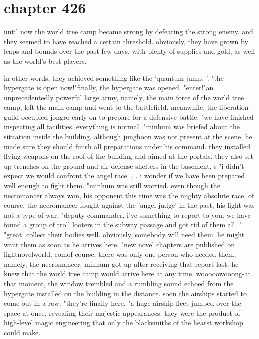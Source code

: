 \section{chapter 426}

until now the world tree camp became strong by defeating the strong enemy.
 and they seemed to have reached a certain threshold.
 obviously, they have grown by leaps and bounds over the past few days, with plenty of supplies and gold, as well as the world's best players.





in other words, they achieved something like the 'quantum jump.
'.
"the hypergate is open now!"finally, the hypergate was opened.
"enter!"an unprecedentedly powerful large army, namely, the main force of the world tree camp, left the main camp and went to the battlefield.
meanwhile, the liberation guild occupied jongro early on to prepare for a defensive battle.
"we have finished inspecting all facilities.
 everything is normal.
"minhum was briefed about the situation inside the building.
 although junghoon was not present at the scene, he made sure they should finish all preparations under his command.
they installed flying weapons on the roof of the building and aimed at the portals.
 they also set up trenches on the ground and air defense shelters in the basement.
s "i didn't expect we would confront the angel race.
.
.
i wonder if we have been prepared well enough to fight them.
"minhum was still worried.
 even though the necromancer always won, his opponent this time was the mighty absolute race.
of course, the necromancer fought against the 'angel judge' in the past, his fight was not a type of war.
"deputy commander, i've something to report to you.
 we have found a group of troll looters in the subway passage and got rid of them all.
"
"great.
 collect their bodies well.
 obviously, somebody will need them.
 he might want them as soon as he arrives here.
"new novel chapters are published on lightnovelworld.
comof course, there was only one person who needed them, namely, the necromancer.
minhum got up after receiving that report last.
 he knew that the world tree camp would arrive here at any time.
wooooowooong-at that moment, the window trembled and a rumbling sound echoed from the hypergate installed on the building in the distance.
 soon the airships started to come out in a row.
"they're finally here.
"a huge airship fleet jumped over the space at once, revealing their majestic appearances.
they were the product of high-level magic engineering that only the blacksmiths of the hearst workshop could make.
